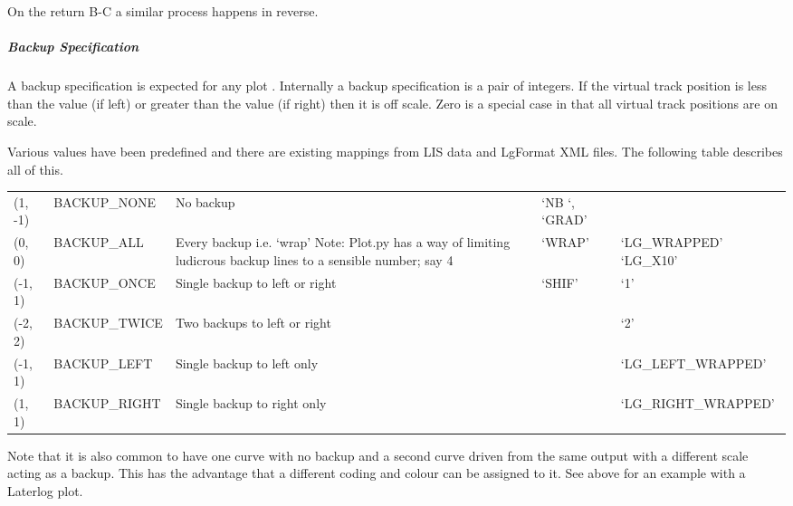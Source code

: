 \documentclass[letterpaper,10pt,english]{sphinxmanual}
\begin{document}
\noindent{}

On the return B-C a similar process happens in reverse.


\subparagraph{Backup Specification}
\label{\detokenize{tech/plotting:backup-specification}}
A backup specification is expected for any plot . Internally a backup specification is a pair of integers. If the virtual track position is less than the value (if left) or greater than the value (if right) then it is off scale. Zero is a special case in that all virtual track positions are on scale.

Various values have been predefined and there are existing mappings from LIS data and LgFormat XML files. The following table describes all of this.


\begin{savenotes}\sphinxattablestart
\centering
\begin{tabulary}{\linewidth}[t]{|T|T|T|T|T|}
\hline
{}\relax &\relax &\relax &\relax &\relax \\
\hline
(1, -1)
&
BACKUP\_NONE
&
No backup
&
‘NB  ‘, ‘GRAD’
&\\
\hline
(0,  0)
&
BACKUP\_ALL
&
Every backup i.e. ‘wrap’ Note: Plot.py has a
way of limiting ludicrous backup lines to a
sensible number; say 4
&
‘WRAP’
&
‘LG\_WRAPPED’
‘LG\_X10’
\\
\hline
(-1, 1)
&
BACKUP\_ONCE
&
Single backup to left or right
&
‘SHIF’
&
‘1’
\\
\hline
(-2, 2)
&
BACKUP\_TWICE
&
Two backups to left or right
&&
‘2’
\\
\hline
(-1, 1)
&
BACKUP\_LEFT
&
Single backup to left only
&&
‘LG\_LEFT\_WRAPPED’
\\
\hline
(1, 1)
&
BACKUP\_RIGHT
&
Single backup to right only
&&
‘LG\_RIGHT\_WRAPPED’
\\
\hline
\end{tabulary}
\par
\sphinxattableend\end{savenotes}

Note that it is also common to have one curve with no backup and a second curve driven from the same output with a different scale acting as a backup. This has the advantage that a different coding and colour can be assigned to it. See {\hyperref[\detokenize{tech/plotting:tech-plotting-legends}]{}} above for an example with a Laterlog plot.
\end{document}
